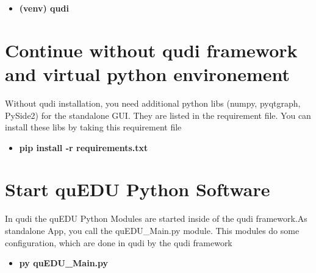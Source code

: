 \begin{itemize}
	\item \textbf{ (venv) qudi}
\end{itemize}

\section{Continue without qudi framework and virtual python environement}

Without qudi installation, you need additional python libs (numpy, pyqtgraph, PySide2) for the standalone GUI. They are listed in the requirement file. You can install these libs by taking this requirement file

\begin{itemize}
	\item \textbf{pip install -r requirements.txt}
\end{itemize}

\section{Start quEDU Python Software}

In qudi the quEDU Python Modules are started inside of the qudi framework.As standalone App, you call the quEDU\_Main.py module. This modules do some 
configuration, which are done in qudi by the qudi framework

\begin{itemize}
	\item \textbf{py quEDU\_Main.py}
\end{itemize}